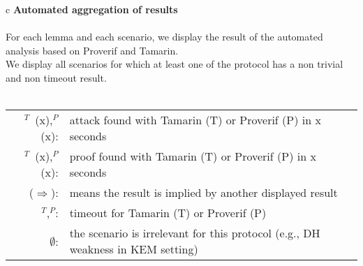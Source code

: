 \documentclass[letterpaper, 10pt, table]{standalone}
\newcommand{\attack}{\textcolor{FireBrick}{\ding{55}}}
\newcommand{\ok}{\textcolor{Green}{\ding{51}}}
\newcommand{\attp}[1]{\attack$^P$~(#1)}
\newcommand{\attt}[1]{\attack$^T$~(#1)}
\newcommand{\implied}{$\Rightarrow$}
\newcommand{\okp}[1]{\ok$^P$~(#1)}
\newcommand{\okt}[1]{\ok$^T$~(#1)}
\newcommand{\timeoutp}{\faClock[regular]$^P$}
\newcommand{\timeoutt}{\faClock[regular]$^T$}
\newcommand{\invalid}{$\emptyset$}
\begin{document}
\begin{tabular}{c}
\textbf{Automated aggregation of results}
\\
\\
For each lemma and each scenario, we display the result of the automated analysis based on Proverif and Tamarin. \\
 We display all scenarios for which at least one of the protocol has a non trivial and non timeout result.
\\
\\
\begin{tabular}{rl}
\attt{x},\attp{x}:& attack found with Tamarin (T) or Proverif (P) in x seconds \\
\okt{x},\okp{x}:& proof found with Tamarin (T) or Proverif (P) in x seconds \\
 (\implied):& means the result is implied by another displayed result \\
\timeoutt,\timeoutp: & timeout for Tamarin (T) or Proverif (P) \\
\invalid: & the scenario is irrelevant for this protocol (e.g., DH weakness in KEM setting)

\end{tabular}

\end{tabular}

 
\end{document}

